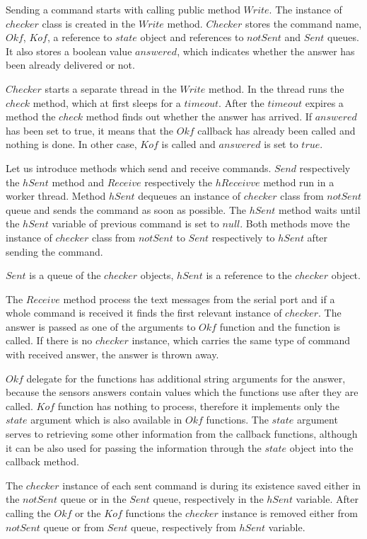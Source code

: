 	
	Sending a command starts with calling public method $Write$. The instance of $checker$ class is created in the $Write$ method.
	$Checker$ stores the command name, $Okf$, $Kof$, a reference to $state$ object and references to $notSent$ 
	and $Sent$ queues.
	It also stores a boolean value $answered$, which indicates whether the answer has been already delivered or not.

	$Checker$ starts a separate thread in the $Write$ method. In the thread runs the $check$ method, which at first sleeps for a $timeout$.
	After the $timeout$ expires a method the $check$ method finds out whether the answer has arrived.
	If $answered$ has been set to true, it means that the $Okf$ callback has already been 
	called and nothing is done. In other case, $Kof$ is called and $answered$ is set to $true$.

	Let us introduce methods which send and receive commands.
	$Send$ respectively  the $hSent$ method and $Receive$ respectively the $hReceivve$ method run in a worker thread. 
	Method $hSent$ dequeues an instance of $checker$ class from $notSent$ queue and
	sends the command as soon as possible. The $hSent$ method waits until the $hSent$ variable
	of previous command is set to $null$. Both methods move the instance
	of $checker$ class from $notSent$ to $Sent$ respectively to $hSent$ after sending the command.

	$Sent$ is a queue of the $checker$ objects, $hSent$ is a reference to the $checker$ object. 
	
	\label{p:oneargument}
	The $Receive$ method process the text messages from the serial port and if a whole command is received
	it finds the first relevant instance of  $checker$.
	The answer is passed as one of the arguments to $Okf$ function and the function is called.
	If there is no $checker$ instance, which carries the same type of command with received answer,
	the answer is thrown away.

	$Okf$ delegate for the functions has additional string arguments for the answer, because the sensors answers contain values
	which the functions use after they are called.
	$Kof$ function has nothing to process, therefore it implements only the $state$ argument 
	which is also available in $Okf$ functions. The $state$ argument serves to retrieving
	some other information from the callback functions, although it can be also used for
	passing the information through the $state$ object into the callback method.

	The $checker$ instance of each sent command is during its existence saved either in the $notSent$
	queue or in the $Sent$ queue, respectively in the $hSent$ variable.
	After calling the $Okf$ or the $Kof$ functions the $checker$ instance is removed either from $notSent$ queue
	or from $Sent$ queue, respectively from $hSent$ variable. 

